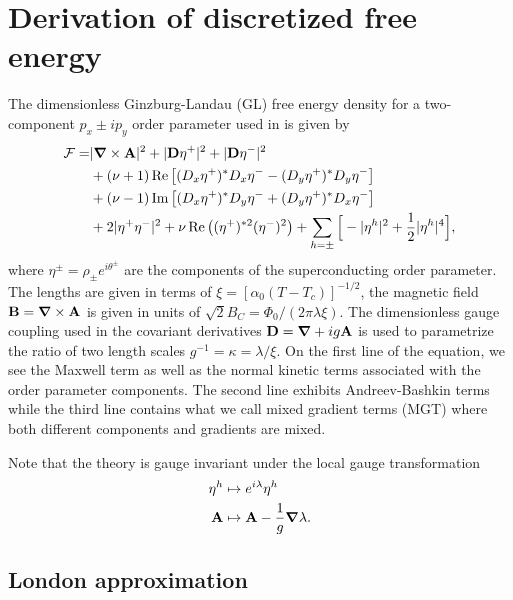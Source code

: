 \section{Derivation of discretized free energy}

The dimensionless Ginzburg-Landau (GL) free energy density for a two-component $p_x\pm ip_y$ order parameter used in \cite{AsleGaraud16} is given by
\begin{equation}
  \begin{split}
	\mathcal{F} = &|{\boldsymbol{\mathbf{\nabla}}}\times{\ensuremath{\boldsymbol{\mathbf{A}}}}|^2 + |{\boldsymbol{\mathbf{D}}}\eta^+|^2 + |{\boldsymbol{\mathbf{D}}}\eta^-|^2\\
	&+ (\nu+1)\operatorname{Re}\big[(D_x\eta^+)^\ast D_x\eta^- - (D_y\eta^+)^\ast D_y\eta^-\big]\\
	& + (\nu-1)\operatorname{Im}\big[(D_x\eta^+)^\ast D_y\eta^- + (D_y\eta^+)^\ast D_x\eta^-\big]\\
	&+ 2|\eta^+\eta^-|^2 + \nu\operatorname{Re}\big( (\eta^+)^{\ast 2}(\eta^-)^2 \big) + \sum_{h=\pm}\Big[-|\eta^h|^2 + \frac{1}{2}|\eta^h|^4\Big],
  \end{split}
  \label{eq:disc:FreeEn:initial}
\end{equation}
where $\eta^\pm=\rho_\pm e^{i\theta^\pm}$ are the components of the superconducting order parameter. The lengths are given in terms of $\xi = [\alpha_0(T-T_c)]^{-1/2}$,
the magnetic field ${\boldsymbol{\mathbf{B}}} = {\boldsymbol{\mathbf{\nabla}}}\times{\ensuremath{\boldsymbol{\mathbf{A}}}}$ is given in units of $\sqrt{2}B_C = \Phi_0/(2\pi\lambda\xi)$. The dimensionless gauge
coupling used in the covariant derivatives ${\boldsymbol{\mathbf{D}}} = {\boldsymbol{\mathbf{\nabla}}} + ig{\boldsymbol{\mathbf{A}}}$ is used to parametrize the ratio of two length scales 
$g^{-1} = \kappa = \lambda/\xi$. On the first line of the equation, we see the Maxwell term as well as the normal kinetic terms associated with the order parameter components. The second
line exhibits Andreev-Bashkin terms while the third line contains what we call mixed gradient terms (MGT) where both different components and gradients are mixed.

Note that the theory is gauge invariant under the local gauge transformation
\begin{subequations}
  \begin{align}
	\eta^h &\mapsto e^{i\lambda}\eta^h \label{eq:disc:Gauge:continuous:eta}\\
	{\boldsymbol{\mathbf{A}}} &\mapsto {\ensuremath{\boldsymbol{\mathbf{A}}}} - \frac{1}{g}{\boldsymbol{\mathbf{\nabla}}}\lambda.
	\label{eq:disc:Gauge:continuous:A}
  \end{align}
  \label{eq:Gauge:continuous}
\end{subequations}

\subsection{London approximation}

